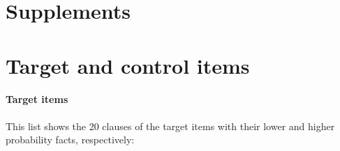 \documentclass[11pt,fleqn]{article}
\newcommand{\6}{\mbox{$[\hspace*{-.6mm}[$}}
\newcommand{\9}{\mbox{$]\hspace*{-.6mm}]$}}
\begin{document}
\newpage

\appendix

\setcounter{table}{0}
\renewcommand{\thetable}{A\arabic{table}}

\setcounter{figure}{0}
\renewcommand{\thefigure}{A\arabic{figure}}

\section*{Supplements}

\section{Target and control items}\label{a-stim}

\paragraph{Target items} This list shows the 20 clauses of the target items with their lower and higher probability facts, respectively:
\end{document}
